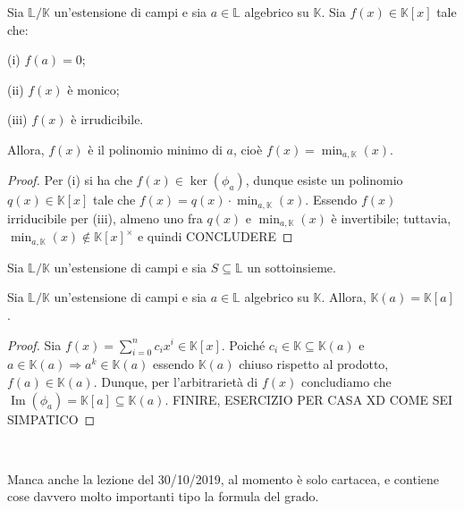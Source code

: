 \begin{prop}[]{}
Sia $\mathbb{L}/\mathbb{K}$ un'estensione di campi e sia $a\in \mathbb{L}$ algebrico su $\mathbb{K}$. Sia $f(x)\in \mathbb{K}[x]$ tale che:

\noindent (i) $f(a)=0$;

\noindent (ii) $f(x)$ è monico;

\noindent (iii) $f(x)$ è irrudicibile.

\noindent Allora, $f(x)$ è il polinomio minimo di $a$, cioè $f(x)=\min_{a,\mathbb{K}}(x)$.
\end{prop}
\vspace{-4mm}
\begin{proof}
Per (i) si ha che $f(x)\in\ker(\phi_a)$, dunque esiste un polinomio $q(x)\in \mathbb{K}[x]$ tale che $f(x)=q(x)\cdot \min_{a,\mathbb{K}}(x)$. Essendo $f(x)$ irriducibile per (iii), almeno uno fra $q(x)$ e $\min_{a,\mathbb{K}}(x)$ è invertibile; tuttavia, $\min_{a,\mathbb{K}}(x)\not\in\mathbb{K}[x]^{\times}$ e quindi CONCLUDERE
\end{proof}

\noindent Sia $\mathbb{L}/\mathbb{K}$ un'estensione di campi e sia $S\subseteq \mathbb{L}$ un sottoinsieme.

\begin{prop}[]{}
Sia $\mathbb{L}/\mathbb{K}$ un'estensione di campi e sia $a\in \mathbb{L}$ algebrico su $\mathbb{K}$. Allora, $\mathbb{K}(a)=\mathbb{K}[a]$.
\end{prop}
\vspace{-4mm}
\begin{proof}
Sia $f(x)=\sum\limits_{i=0}^n c_i x^i\in \mathbb{K}[x]$. Poiché $c_i \in \mathbb{K}\subseteq \mathbb{K}(a)$ e $a\in \mathbb{K}(a)\Rightarrow a^k\in \mathbb{K}(a)$ essendo $\mathbb{K}(a)$ chiuso rispetto al prodotto, $f(a)\in \mathbb{K}(a)$. Dunque, per l'arbitrarietà di $f(x)$ concludiamo che $\operatorname{Im}(\phi_a)=\mathbb{K}[a]\subseteq \mathbb{K}(a)$. FINIRE, ESERCIZIO PER CASA XD COME SEI SIMPATICO
\end{proof}

\

\noindent Manca anche la lezione del 30/10/2019, al momento è solo cartacea, e contiene cose davvero molto importanti tipo la formula del grado.